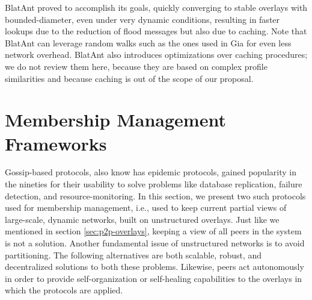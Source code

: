 \documentclass[runningheads]{llncs}
\begin{document}
BlatAnt proved to accomplish its goals, quickly converging to stable overlays with bounded-diameter, even under very dynamic conditions, resulting in faster lookups due to the reduction of flood messages but also due to caching. Note that BlatAnt can leverage random walks such as the ones used in Gia for even less network overhead. BlatAnt also introduces optimizations over caching procedures; we do not review them here, because they are based on complex profile similarities and because caching is out of the scope of our proposal.\newline

\section{Membership Management Frameworks}\label{sec:membership-management}

Gossip-based protocols, also know has epidemic protocols, gained popularity in the nineties for their usability to solve problems like database replication, failure detection, and resource-monitoring. In this section, we present two such protocols used for membership management, i.e., used to keep current partial views of large-scale, dynamic networks, built on unstructured overlays. Just like we mentioned in section \ref{sec:p2p-overlays}, keeping a view of all peers in the system is not a solution. Another fundamental issue of unstructured networks is to avoid partitioning. The following alternatives are both scalable, robust, and decentralized solutions to both these problems. Likewise, peers act autonomously in order to provide self-organization or self-healing capabilities to the overlays in which the protocols are applied.
\end{document}
